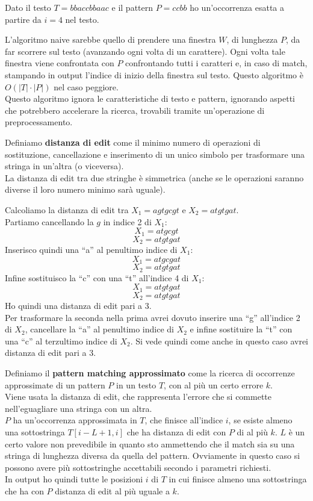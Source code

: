\documentclass[a4paper,12pt, oneside]{book}
\begin{document}
\begin{esempio}
  Dato il testo $T=bbaccbbaac$ e il pattern $P=ccbb$ ho un'occorrenza esatta a
  partire da $i=4$ nel testo.
\end{esempio}
L'algoritmo naive sarebbe quello di prendere una finestra $W$, di lunghezza $P$,
da far scorrere sul testo (avanzando ogni volta di un carattere). Ogni volta
tale finestra viene confrontata con $P$ confrontando tutti i caratteri e, in
caso di match, stampando in output l'indice di inizio della finestra sul
testo. Questo algoritmo è $O(|T|\cdot |P|)$ nel caso peggiore.\\ 
Questo algoritmo ignora le caratteristiche di testo e pattern, ignorando aspetti
che potrebbero accelerare la ricerca, trovabili tramite un'operazione di
preprocessamento.
\begin{definizione}
  Definiamo \textbf{distanza di edit} come il minimo numero di operazioni di
  sostituzione, cancellazione e inserimento di un unico simbolo per trasformare
  una stringa in un'altra (o viceversa). \\
  La distanza di edit tra due stringhe è simmetrica (anche se le operazioni
  saranno diverse il loro numero minimo sarà uguale).
\end{definizione}
\begin{esempio}
  Calcoliamo la distanza di edit tra $X_1=agtgcgt$ e $X_2=atgtgat$.\\
  Partiamo cancellando la $g$ in indice 2 di $X_1$:
  \[X_1=atgcgt\]
  \[X_2=atgtgat\]
  Inserisco quindi una ``a'' al penultimo indice di $X_1$:
  \[X_1=atgcgat\]
  \[X_2=atgtgat\]
  Infine sostituisco la ``c'' con una ``t'' all'indice 4 di $X_1$:
  \[X_1=atgtgat\]
  \[X_2=atgtgat\]
  Ho quindi una distanza di edit pari a 3.\\
  Per trasformare la seconda nella prima avrei dovuto inserire una ``g''
  all'indice 2 di $X_2$, cancellare la ``a'' al penultimo indice di $X_2$ e
  infine sostituire la ``t'' con una ``c'' al terzultimo indice di $X_2$. Si
  vede quindi come anche in questo caso avrei distanza di edit pari a 3.
\end{esempio}
\begin{definizione}
  Definiamo il \textbf{pattern matching approssimato} come la ricerca di
  occorrenze approssimate di un pattern $P$ in un testo $T$, con al più un certo
  errore $k$.\\
  Viene usata la \textnormal{distanza di edit}, che rappresenta l'errore che si
  commette nell'eguagliare una stringa con un altra.\\
  $P$ ha un'occorrenza approssimata in $T$, che finisce all'indice $i$, se
  esiste almeno una sottostringa $T[i-L+1,i]$ che ha distanza di edit con $P$ di
  al più $k$. $L$ è un certo valore non prevedibile in quanto sto ammettendo che
  il match sia su una stringa di lunghezza diversa da quella del
  pattern. Ovviamente in questo caso si possono avere più sottostringhe
  accettabili secondo i parametri richiesti.\\
  In output ho quindi tutte le posizioni $i$ di $T$ in cui finisce almeno una
  sottostringa che ha con $P$ distanza di edit al più uguale a $k$.
\end{definizione}
\end{document}
